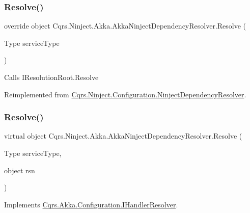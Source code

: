 \subsubsection{\texorpdfstring{Resolve()}{Resolve()}\hspace{0.1cm}{\footnotesize\ttfamily [1/2]}}
{\footnotesize\ttfamily override object Cqrs.\+Ninject.\+Akka.\+Akka\+Ninject\+Dependency\+Resolver.\+Resolve (\begin{DoxyParamCaption}\item[{Type}]{service\+Type }\end{DoxyParamCaption})\hspace{0.3cm}{\ttfamily [virtual]}}



Calls I\+Resolution\+Root.\+Resolve 



Reimplemented from \hyperlink{classCqrs_1_1Ninject_1_1Configuration_1_1NinjectDependencyResolver_aef2a2be58a2562a349572e9946cd2930}{Cqrs.\+Ninject.\+Configuration.\+Ninject\+Dependency\+Resolver}.

\mbox{\label{classCqrs_1_1Ninject_1_1Akka_1_1AkkaNinjectDependencyResolver_ab860d9bcf44b62098a8df91bbcb5013d}} 
\subsubsection{\texorpdfstring{Resolve()}{Resolve()}\hspace{0.1cm}{\footnotesize\ttfamily [2/2]}}
{\footnotesize\ttfamily virtual object Cqrs.\+Ninject.\+Akka.\+Akka\+Ninject\+Dependency\+Resolver.\+Resolve (\begin{DoxyParamCaption}\item[{Type}]{service\+Type,  }\item[{object}]{rsn }\end{DoxyParamCaption})\hspace{0.3cm}{\ttfamily [virtual]}}



Implements \hyperlink{interfaceCqrs_1_1Akka_1_1Configuration_1_1IHandlerResolver_abae10eed2d92eb3f2831c5eba7e3c2d3}{Cqrs.\+Akka.\+Configuration.\+I\+Handler\+Resolver}.

